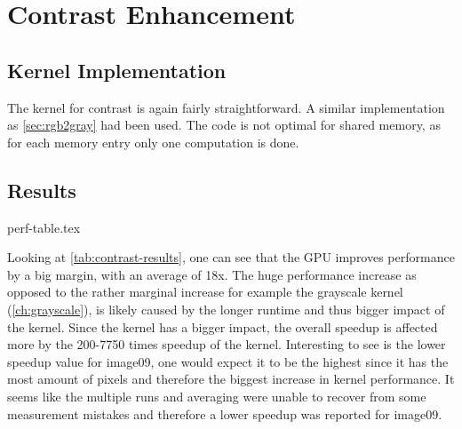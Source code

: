 \documentclass[final]{report}
\begin{document}
\chapter{Contrast Enhancement}

\section{Kernel Implementation}
The kernel for contrast is again fairly straightforward.
A similar implementation as \cref{sec:rgb2gray} had been used.
The code is not optimal for shared memory, as for each memory entry only one computation is done.

\section{Results}
{perf-table.tex}

Looking at \cref{tab:contrast-results}, one can see that the GPU improves performance by a big margin, with an average of 18x.
The huge performance increase as opposed to the rather marginal increase for example the grayscale kernel (\cref{ch:grayscale}), is likely caused by the longer runtime and thus bigger impact of the kernel.
Since the kernel has a bigger impact, the overall speedup is affected more by the 200-7750 times speedup of the kernel.
Interesting to see is the lower speedup value for image09, one would expect it to be the highest since it has the most amount of pixels and therefore the biggest increase in kernel performance.
It seems like the multiple runs and averaging were unable to recover from some measurement mistakes and therefore a lower speedup was reported for image09.
\end{document}
